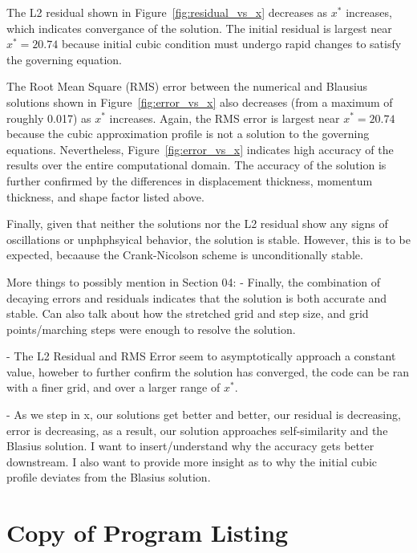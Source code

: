 \documentclass[letterpaper,12pt]{article}
\begin{document}
The L2 residual shown in Figure~\ref{fig:residual_vs_x} decreases as $x^*$ increases, which indicates convergance of the solution. The initial residual is largest near $x^* = 20.74$ because initial cubic condition must undergo rapid changes to satisfy the governing equation.

The Root Mean Square (RMS) error between the numerical and Blausius solutions shown in Figure~\ref{fig:error_vs_x} also decreases (from a maximum of roughly 0.017) as $x^*$ increases. Again, the RMS error is largest near $x^* = 20.74$ because the cubic approximation profile is not a solution to the governing equations. Nevertheless, Figure~\ref{fig:error_vs_x} indicates high accuracy of the results over the entire computational domain. The accuracy of the solution is further confirmed by the differences in displacement thickness, momentum thickness, and shape factor listed above.

Finally, given that neither the solutions nor the L2 residual show any signs of oscillations or unphphsyical behavior, the solution is stable. However, this is to be expected, becaause the Crank-Nicolson scheme is unconditionally stable.

More things to possibly mention in Section 04:
- Finally, the combination of decaying errors and residuals indicates that the solution is both accurate and stable. Can also talk about how the stretched grid and step size, and grid points/marching steps were enough to resolve the solution.

- The L2 Residual and RMS Error seem to asymptotically approach a constant value, howeber to further confirm the solution has converged, the code can be ran with a finer grid, and over a larger range of $x^*$.

- As we step in x, our solutions get better and better, our residual is decreasing, error is decreasing, as a result, our solution approaches self-similarity and the Blasius solution. I want to insert/understand why the accuracy gets better downstream. I also want to provide more insight as to why the initial cubic profile deviates from the Blasius solution.

\newpage
\appendix
\section{Copy of Program Listing}
\label{appendix-code}
\end{document}
